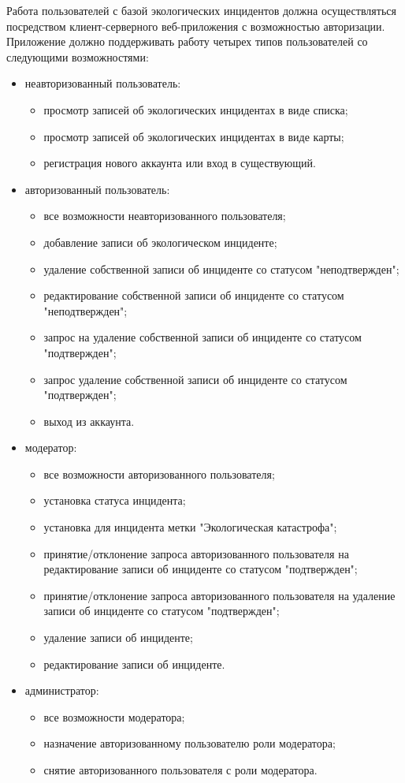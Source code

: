 Работа пользователей с базой экологических инцидентов должна осуществляться посредством клиент-серверного веб-приложения с возможностью авторизации. Приложение должно поддерживать работу четырех типов пользователей со следующими возможностями: 
\begin{itemize}
	\item неавторизованный пользователь:
	\begin{itemize}
		\item просмотр записей об экологических инцидентах в виде списка;
		\item просмотр записей об экологических инцидентах в виде карты;
		\item регистрация нового аккаунта или вход в существующий.
	\end{itemize}
	\item авторизованный пользователь:
	\begin{itemize}
		\item все возможности неавторизованного пользователя;
		\item добавление записи об экологическом инциденте;
		\item удаление собственной записи об инциденте со статусом "неподтвержден";
		\item редактирование собственной записи об инциденте со статусом "неподтвержден";
		\item запрос на удаление собственной записи об инциденте со статусом "подтвержден";
		\item запрос удаление собственной записи об инциденте со статусом "подтвержден";
		\item выход из аккаунта.
	\end{itemize}
	\item модератор:
	\begin{itemize}
		\item все возможности авторизованного пользователя;
		\item установка статуса инцидента;
		\item установка для инцидента метки "Экологическая катастрофа";
		\item принятие/отклонение запроса авторизованного пользователя на редактирование записи об инциденте со статусом "подтвержден";
		\item принятие/отклонение запроса авторизованного пользователя на удаление записи об инциденте со статусом "подтвержден";
		\item удаление записи об инциденте;
		\item редактирование записи об инциденте.
	\end{itemize}
	\item администратор:
	\begin{itemize}
		\item все возможности модератора;
		\item назначение авторизованному пользователю роли модератора;
		\item снятие авторизованного пользователя с роли модератора. 
	\end{itemize}
\end{itemize}

